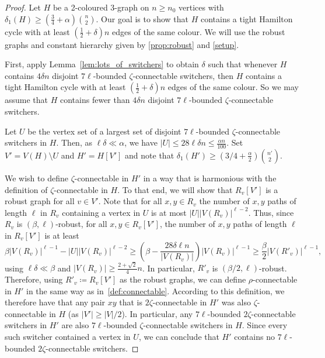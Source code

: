 \documentclass[A4paper,12pt]{article}
\theoremstyle{definition}
\begin{document}
\begin{proof}[Proof]
    Let $H$ be a 2-coloured 3-graph on $n \geq n_0$ vertices with $\delta_1(H) \geq (\frac{3}{4} + \alpha)\binom{n}{2}$. Our goal is to show that $H$ contains a tight Hamilton cycle with at least $(\frac{1}{2} + \delta)n$ edges of the same colour. We will use the robust graphs and constant hierarchy given by \cref{prop:robust} and \cref{setup}.

    First, apply Lemma~\ref{lem:lots_of_switchers} to obtain $\delta$ such that whenever $H$ contains $4\delta n$ disjoint $7\ell$-bounded $\zeta$-connectable switchers, then $H$ contains a tight Hamilton cycle with at least $(\frac{1}{2} + \delta)n$ edges of the same colour. So we may assume that $H$ contains fewer than $4\delta n$ disjoint $7\ell$-bounded $\zeta$-connectable switchers.

   Let $U$ be the vertex set of a largest set of disjoint $7\ell$-bounded $\zeta$-connectable switchers in $H$. Then, as $\ell\delta \ll \alpha$, we have $|U|\leq 28\ell\delta n \leq \frac{\alpha n}{100}$. Set $V'=V(H)\setminus U$ and $H'=H[V']$ and note that $\delta_1(H')\geq (3/4 + \frac{\alpha}{2})\binom{n'}{2}$. 

We wish to define  $\zeta$-connectable in $H'$ in a way that is harmonious with the definition of $\zeta$-connectable in $H$. To that end, we will show that $R_v[V']$  is a robust graph for all $v \in V'$. Note that for all $x,y \in R_v$ the number of $x,y$ paths of length $\ell$ in $R_v$ containing a vertex in $U$ is at most $|U||V(R_v)|^{\ell-2}$. Thus, since $R_v$ is $(\beta,\ell)$-robust, for all $x,y \in R_v[V']$, the number of $x,y$ paths of length $\ell$ in $R_v[V']$ is at least
\[\beta |V(R_v)|^{\ell-1} - |U||V(R_v)|^{\ell-2} \ge \left(\beta  - \frac{28\delta\ell n}{|V(R_v)|}\right)|V(R_v)|^{\ell-1} \ge \frac{\beta}{2}|V(R'_v)|^{\ell -1},\]
using $\ell\delta \ll \beta$ and $|V(R_v)| \ge \frac{2+\sqrt{2}}{4}n$.
In particular, $R'_v$ is $(\beta/2, \ell)$-robust. Therefore, using $R'_v \coloneqq R_v[V']$ as the robust graphs, we can define $\rho$-connectable in $H'$ in the same way as in~\cref{def:connectable}. According to this definition, we therefore have that  any pair $xy$ that is $2\zeta$-connectable in $H'$ was also $\zeta$-connectable in $H$ (as $|V'| \ge |V|/2$). In particular, any $7\ell$-bounded $2\zeta$-connectable switchers in $H'$ are also $7\ell$-bounded $\zeta$-connectable switchers in $H$. Since every such switcher contained a vertex in $U$, we can conclude that $H'$ contains no $7\ell$-bounded $2\zeta$-connectable switchers.


\end{proof}
\end{document}
